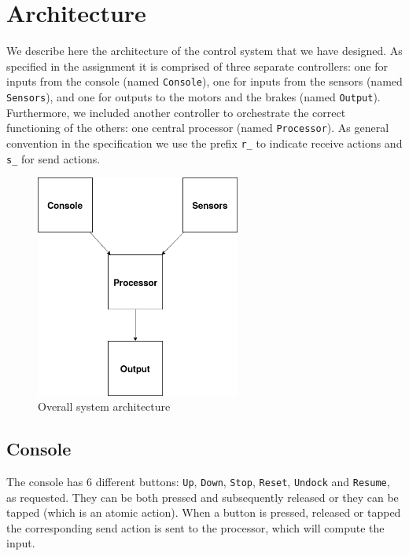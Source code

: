 \section{Architecture}

We describe here the architecture of the control system that we have designed.
As specified in the assignment it is comprised of three separate controllers:
one for inputs from the console (named \texttt{Console}), one for
inputs from the sensors (named \texttt{Sensors}), and
one for outputs to the motors and the brakes (named \texttt{Output}).
Furthermore, we included another controller to orchestrate the correct functioning
of the others: one central processor (named \texttt{Processor}).
As general convention in the specification we use the prefix \texttt{r\_} to
indicate receive actions and \texttt{s\_} for send actions.

\begin{figure}[h]
    \centering
    \includegraphics[width=0.6\textwidth]{img/system.png}
    \caption{Overall system architecture}
\end{figure}

\subsection{Console}

The console has 6 different buttons: \texttt{Up}, \texttt{Down},  \texttt{Stop},
\texttt{Reset},  \texttt{Undock} and \texttt{Resume}, as requested.
They can be both pressed and subsequently released or they can be tapped
(which is an atomic action).
When a button is pressed, released or tapped the corresponding send action
is sent to the processor, which will compute the input.

